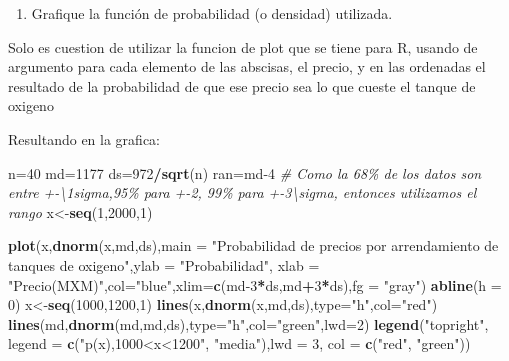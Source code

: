 \documentclass[
]{article}
\newenvironment{Shaded}{\begin{snugshade}}{\end{snugshade}}
\newcommand{\AttributeTok}[1]{\textcolor[rgb]{0.13,0.29,0.53}{#1}}
\newcommand{\CommentTok}[1]{\textcolor[rgb]{0.56,0.35,0.01}{\textit{#1}}}
\newcommand{\DecValTok}[1]{\textcolor[rgb]{0.00,0.00,0.81}{#1}}
\newcommand{\FunctionTok}[1]{\textcolor[rgb]{0.13,0.29,0.53}{\textbf{#1}}}
\newcommand{\NormalTok}[1]{#1}
\newcommand{\OtherTok}[1]{\textcolor[rgb]{0.56,0.35,0.01}{#1}}
\newcommand{\SpecialCharTok}[1]{\textcolor[rgb]{0.81,0.36,0.00}{\textbf{#1}}}
\newcommand{\StringTok}[1]{\textcolor[rgb]{0.31,0.60,0.02}{#1}}
\providecommand{\tightlist}{%
  \setlength{\itemsep}{0pt}\setlength{\parskip}{0pt}}
\begin{document}
\begin{enumerate}
\def\labelenumi{\arabic{enumi}.}
\setcounter{enumi}{1}
\tightlist
\item
  Grafique la función de probabilidad (o densidad) utilizada.
\end{enumerate}

Solo es cuestion de utilizar la funcion de plot que se tiene para R,
usando de argumento para cada elemento de las abscisas, el precio, y en
las ordenadas el resultado de la probabilidad de que ese precio sea lo
que cueste el tanque de oxigeno

Resultando en la grafica:

\begin{Shaded}
\begin{Highlighting}[]
\NormalTok{n}\OtherTok{=}\DecValTok{40}
\NormalTok{md}\OtherTok{=}\DecValTok{1177}
\NormalTok{ds}\OtherTok{=}\DecValTok{972}\SpecialCharTok{/}\FunctionTok{sqrt}\NormalTok{(n)}
\NormalTok{ran}\OtherTok{=}\NormalTok{md}\DecValTok{{-}4} \CommentTok{\# Como la 68\% de los datos son entre +{-}\textbackslash{}1sigma,95\% para +{-}2, 99\% para +{-}3\textbackslash{}sigma, entonces utilizamos el rango}
\NormalTok{x}\OtherTok{\textless{}{-}}\FunctionTok{seq}\NormalTok{(}\DecValTok{1}\NormalTok{,}\DecValTok{2000}\NormalTok{,}\DecValTok{1}\NormalTok{)}

\FunctionTok{plot}\NormalTok{(x,}\FunctionTok{dnorm}\NormalTok{(x,md,ds),}\AttributeTok{main =} \StringTok{"Probabilidad de precios por arrendamiento de tanques de oxigeno"}\NormalTok{,}\AttributeTok{ylab =} \StringTok{"Probabilidad"}\NormalTok{, }\AttributeTok{xlab =} \StringTok{"Precio(MXM)"}\NormalTok{,}\AttributeTok{col=}\StringTok{"blue"}\NormalTok{,}\AttributeTok{xlim=}\FunctionTok{c}\NormalTok{(md}\DecValTok{{-}3}\SpecialCharTok{*}\NormalTok{ds,md}\SpecialCharTok{+}\DecValTok{3}\SpecialCharTok{*}\NormalTok{ds),}\AttributeTok{fg =} \StringTok{"gray"}\NormalTok{)}
\FunctionTok{abline}\NormalTok{(}\AttributeTok{h =} \DecValTok{0}\NormalTok{)}
\NormalTok{x}\OtherTok{\textless{}{-}}\FunctionTok{seq}\NormalTok{(}\DecValTok{1000}\NormalTok{,}\DecValTok{1200}\NormalTok{,}\DecValTok{1}\NormalTok{)}
\FunctionTok{lines}\NormalTok{(x,}\FunctionTok{dnorm}\NormalTok{(x,md,ds),}\AttributeTok{type=}\StringTok{"h"}\NormalTok{,}\AttributeTok{col=}\StringTok{"red"}\NormalTok{)}
\FunctionTok{lines}\NormalTok{(md,}\FunctionTok{dnorm}\NormalTok{(md,md,ds),}\AttributeTok{type=}\StringTok{"h"}\NormalTok{,}\AttributeTok{col=}\StringTok{"green"}\NormalTok{,}\AttributeTok{lwd=}\DecValTok{2}\NormalTok{)}
\FunctionTok{legend}\NormalTok{(}\StringTok{"topright"}\NormalTok{, }\AttributeTok{legend =} \FunctionTok{c}\NormalTok{(}\StringTok{"p(x),1000\textless{}x\textless{}1200"}\NormalTok{, }\StringTok{"media"}\NormalTok{),}\AttributeTok{lwd =} \DecValTok{3}\NormalTok{, }\AttributeTok{col =} \FunctionTok{c}\NormalTok{(}\StringTok{"red"}\NormalTok{, }\StringTok{"green"}\NormalTok{))}
\end{Highlighting}
\end{Shaded}
\end{document}
